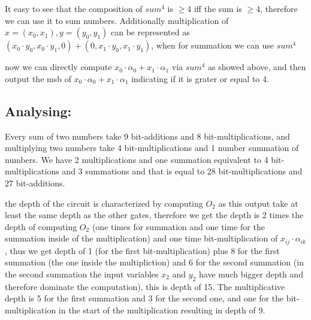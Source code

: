 \documentclass[11pt]{article}
\begin{document}
It easy to see that the composition of $sum^{4}$ is $\geq 4$ iff the sum is $\geq 4$, therefore we can use it to sum numbers. Additionally multiplication of $x=(x_0,x_1),y=(y_0,y_1)$ can be represented as $(x_0\cdot y_0,x_0\cdot y_1,0) + (0,x_1\cdot y_0,x_1\cdot y_1)$, when for summation we can use $sum^{4}$

now we can directly compute $x_0\cdot \alpha_0 + x_1 \cdot \alpha_1$ via $sum^{4}$ as showed above, and then output the msb of $x_0\cdot \alpha_0 + x_1 \cdot \alpha_1$ indicating if it is grater or equal to 4.
\subsection*{Analysing:}
Every sum of two numbers take 9 bit-additions and 8 bit-multiplications, and multiplying two numbers take 4 bit-multiplications and 1 number summation of numbers. We have 2 multiplications and one summation equivalent to 4 bit-multiplications and 3 summations and that is equal to 28 bit-multiplications and 27 bit-additions.

the depth of the circuit is characterized by computing $O_2$ as this output take at least the same depth as the other gates, therefore we get the depth is 2 times the depth of computing $O_2$ (one times for summation and one time for the summation inside of the multiplication) and one time bit-multiplication of $x_{ij} \cdot \alpha_{ik}$, thus we get depth of 1 (for the first bit-multiplication) plus 8 for the first summation (the one inside the multipliction) and 6 for the second summation (in the second summation the input variables $x_2$ and $y_2$ have much bigger depth and therefore dominate the computation), this is depth of 15.
The multiplicative depth is 5 for the first summation and 3 for the second one, and one for the bit-multiplication in the start of the multiplication resulting in depth of 9.
\end{document}
